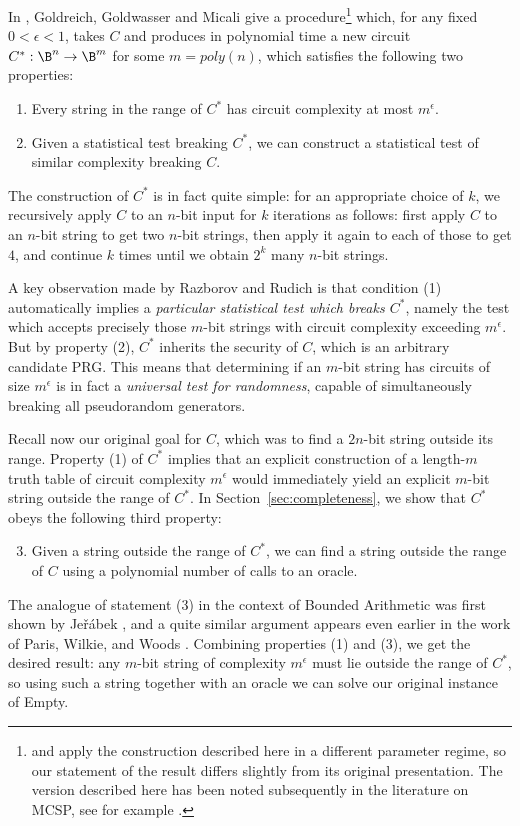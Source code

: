 In \cite{GGM}, Goldreich, Goldwasser and Micali give a procedure\footnote{\cite{GGM} and \cite{natural-proofs} apply the construction described here in a different parameter regime, so our statement of the result differs slightly from its original presentation. The version described here has been noted subsequently in the literature on {\sc MCSP}, see for example \cite{MCSP-OWF}.} which, for any fixed $0 < \epsilon < 1$, takes $C$ and produces in polynomial time a new circuit $C^*: \B^n \rightarrow \B^{m}$ for some $m = poly(n)$, which satisfies the following two properties:
\begin{enumerate}[(1)]
    \item Every string in the range of $C^*$ has circuit complexity at most $m^{\epsilon}$.
    \item Given a statistical test breaking $C^*$, we can construct a statistical test of similar complexity breaking $C$.
\end{enumerate}
The construction of $C^*$ is in fact quite simple: for an appropriate choice of $k$, we recursively apply $C$ to an $n$-bit input for $k$ iterations as follows: first apply $C$ to an $n$-bit string to get two $n$-bit strings, then apply it again to each of those to get $4$, and continue $k$ times until we obtain $2^k$ many $n$-bit strings.

A key observation made by Razborov and Rudich \cite{natural-proofs} is that condition (1) automatically implies a \emph{particular statistical test which breaks $C^*$}, namely the test which accepts precisely those $m$-bit strings with circuit complexity exceeding $m^{\epsilon}$. But by property (2), $C^*$ inherits the security of $C$, which is an arbitrary candidate PRG. This means that determining if an $m$-bit string has circuits of size $m^{\epsilon}$ is in fact a \emph{universal test for randomness}, capable of simultaneously breaking all pseudorandom generators.

Recall now our original goal for $C$, which was to find a $2n$-bit string outside its range. Property (1) of $C^*$ implies that an explicit construction of a length-$m$ truth table of circuit complexity $m^{\epsilon}$ would immediately yield an explicit $m$-bit string outside the range of $C^*$. In Section~\ref{sec:completeness}, we show that $C^*$ obeys the following third property:
\begin{enumerate}[(1)]
    \setcounter{enumi}{2}
    \item Given a string outside the range of $C^*$, we can find a string outside the range of $C$ using a polynomial number of calls to an  oracle.
\end{enumerate}
The analogue of statement (3) in the context of Bounded Arithmetic was first shown by Je\v{r}\'{a}bek \cite{Jerabek}, and a quite similar argument appears even earlier in the work of Paris, Wilkie, and Woods \cite{Paris-Wilkie-Woods}. Combining properties (1) and (3), we get the desired result: any $m$-bit string of complexity $m^{\epsilon}$ must lie outside the range of $C^*$, so using such a string together with an  oracle we can solve our original instance of {\sc Empty}.

